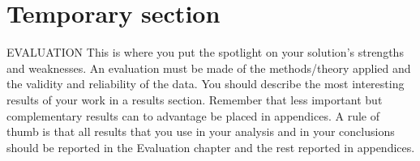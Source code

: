 \section{Temporary section}
EVALUATION This is where you put the spotlight on your solution's strengths and
weaknesses. An evaluation must be made of the methods/theory applied and the validity
and reliability of the data. You should describe the most interesting results of your work in a
results section. Remember that less important but complementary results can to advantage
be placed in appendices. A rule of thumb is that all results that you use in your analysis and
in your conclusions should be reported in the Evaluation chapter and the rest reported in
appendices.

